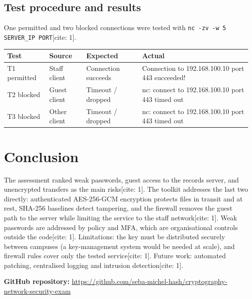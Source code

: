 \documentclass[11pt,a4paper]{article}
\newcommand{\repourl}{\url{https://github.com/seba-michel-hash/cryptography-network-security-exam}}
\begin{document}
\subsection{Test procedure and results}
One permitted and two blocked connections were tested with \texttt{nc -zv -w 5 SERVER\_IP PORT}[cite: 1].
\begin{center}
\begin{tabular}{@{}llp{3.3cm}p{4.5cm}@{}}
\toprule
Test & Source & Expected & Actual\\ \midrule
T1 permitted & Staff client & Connection succeeds & Connection to 192.168.100.10 port 443 succeeded!\\
T2 blocked & Guest client & Timeout / dropped & nc: connect to 192.168.100.10 port 443 timed out\\
T3 blocked & Other client & Timeout / dropped & nc: connect to 192.168.100.10 port 443 timed out\\ \bottomrule
\end{tabular}
\end{center}

\section{Conclusion}\label{sec:conclusion}
The assessment ranked weak passwords, guest access to the records server, and unencrypted transfers as the main risks[cite: 1].
The toolkit addresses the last two directly: authenticated AES-256-GCM encryption protects files in transit and at rest, SHA-256
baselines detect tampering, and the firewall removes the guest path to the server while limiting the service to the staff
network[cite: 1]. Weak passwords are addressed by policy and MFA, which are organisational controls outside the code[cite: 1]. Limitations: the key must
be distributed securely between campuses (a key-management system would be needed at scale), and firewall rules cover only
the tested service[cite: 1]. Future work: automated patching, centralised logging and intrusion detection[cite: 1].

\medskip
\noindent\textbf{GitHub repository:} \repourl
\end{document}
